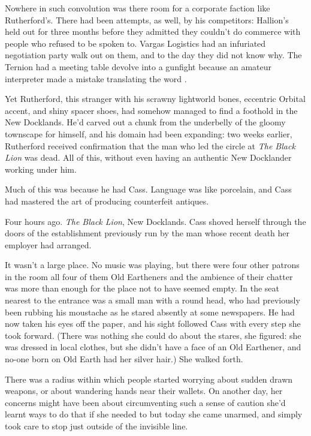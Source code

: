 Nowhere in such convolution was there room for a corporate faction
like Rutherford's. There had been attempts, as well, by his
competitors: Hallion's held out for three months before they admitted
they couldn't do commerce with people who refused to be spoken
to. Vargas Logistics had an infuriated negotiation party walk out on
them, and to the day they did not know why. The Ternion had a meeting
table devolve into a gunfight because an amateur interpreter made a
mistake translating the word .

Yet Rutherford, this stranger with his scrawny lightworld bones,
eccentric Orbital accent, and shiny spacer shoes, had somehow managed
to find a foothold in the New Docklands. He'd carved out a chunk from
the underbelly of the gloomy townscape for himself, and his domain had
been expanding: two weeks earlier, Rutherford received confirmation
that the man who led the circle at \textit{The Black Lion} was
dead. All of this, without even having an authentic New Docklander
working under him.

Much of this was because he had Cass. Language was like porcelain, and
Cass had mastered the art of producing counterfeit antiques.

Four hours ago. \textit{The Black Lion}, New Docklands. Cass shoved
herself through the doors of the establishment previously run by the
man whose recent death her employer had arranged.

It wasn't a large place. No music was playing, but there were four
other patrons in the room \textemdash{} all four of them Old
Eartheners \textemdash{} and the ambience of their chatter was more
than enough for the place not to have seemed empty. In the seat
nearest to the entrance was a small man with a round head, who had
previously been rubbing his moustache as he stared absently at some
newspapers. He had now taken his eyes off the paper, and his sight
followed Cass with every step she took forward. (There was nothing she
could do about the stares, she figured: she was dressed in local
clothes, but she didn't have a face of an Old Earthener, and no-one
born on Old Earth had her silver hair.) She walked forth.

There was a radius within which people started worrying about sudden
drawn weapons, or about wandering hands near their wallets. On another
day, her concerns might have been about circumventing such a sense of
caution \textemdash{} she'd learnt ways to do that if she needed to
\textemdash{} but today she came unarmed, and simply took care to stop
just outside of the invisible line.

